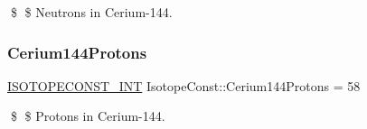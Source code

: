 \$ \$ Neutrons in Cerium-\/144. \mbox{\label{group___isotope_const-_cerium-_ce144_gac6527e4cbb32809e03fd189a5342e908}} 
\subsubsection{\texorpdfstring{Cerium144\+Protons}{Cerium144Protons}}
{\footnotesize\ttfamily \mbox{\hyperlink{group___isotope_const-_macros_ga5f18360b3e99483a35c32d789e62621c}{I\+S\+O\+T\+O\+P\+E\+C\+O\+N\+S\+T\+\_\+\+I\+NT}} Isotope\+Const\+::\+Cerium144\+Protons = 58}

\$ \$ Protons in Cerium-\/144. 
